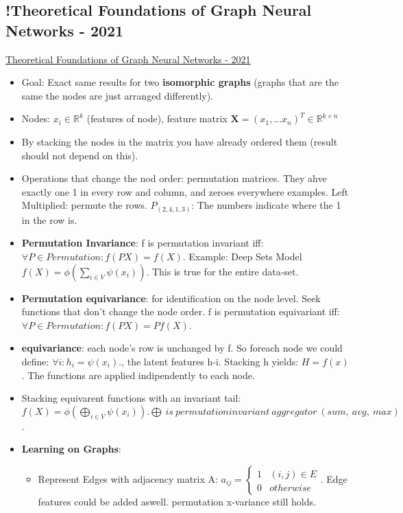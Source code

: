 \subsection{!Theoretical Foundations of Graph Neural Networks - 2021}
\href{https://www.youtube.com/watch?v=uF53xsT7mjc}{Theoretical Foundations of Graph Neural Networks - 2021}
\begin{itemize}[noitemsep,nolistsep]
	\item Goal: Exact same results for two \textbf{isomorphic graphs} (graphs that are the same the nodes are just arranged differently).
	\item Nodes: $x_i \in \mathbb{R}^k$ (features of node), feature matrix $\mathbf{X} = (x_1,...x_n)^T \in \mathbb{R}^{k \times n}$
	\item By stacking the nodes in the matrix you have already ordered them (result should not depend on this).
	\item Operations that change the nod order: permutation matrices. They ahve exactly one 1 in every row and column, and zeroes everywhere examples. Left Multiplied: permute the rows. $P_{(2,4,1,3)}$: The numbers indicate where the 1 in the row is.
	\item \textbf{Permutation Invariance}: f is permutation invariant iff: $\forall P \in Permutation: f(PX) = f(X)$. Example: Deep Sets Model $f(X) = \phi(\sum_{i \in V} \psi(x_i))$. This is true for the entire data-set.
	\item \textbf{Permutation equivariance}: for identification on the node level. Seek functions that don't change the node order. f is permutation equivariant iff: $\forall P \in Permutation: f(PX) = Pf(X)$.
	\item \textbf{equivariance}: each node's row is unchanged by f. So foreach node we could define: $\forall i: h_i = \psi(x_i).$, the latent features h-i. Stacking h yields: $H=f(x)$. The functions are applied indipendently to each node.
	\item Stacking equivarent functions with an invariant tail: $f(X) = \phi(\bigoplus_{i \in V}\psi(x_i)). \bigoplus\ is\ permutationinvariant\ aggregator\ (sum,\ avg,\ max)$.
	\item \textbf{Learning on Graphs}:
	\begin{itemize}[noitemsep,nolistsep]
		\item Represent Edges with adjacency matrix A: $a_{ij} = \begin{cases} 1& (i,j) \in E \\ 0 & otherwise \end{cases}$. Edge features could be added aswell. permutation x-variance still holds.

\end{itemize}
\end{itemize}
